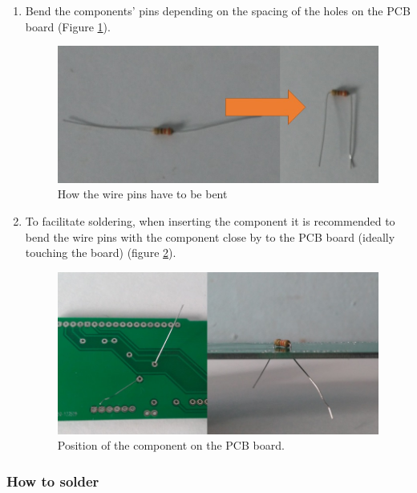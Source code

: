 \documentclass[12pt,letterpaper]{article}
\numberwithin{figure}{section}
\numberwithin{equation}{section}
\numberwithin{table}{section}
\begin{document}
\begin{enumerate}
    \item Bend the components' pins depending on the spacing of the holes on the PCB board (Figure \ref{fig:29}).
    
\begin{figure}[H]
    \centering
    \includegraphics[scale=0.5]{Figuras/figure_29.jpg}
    \caption{How the wire pins have to be bent}
    \label{fig:29}
\end{figure}

    \item To facilitate soldering, when inserting the component it is recommended to bend the wire pins with the component close by to the PCB board (ideally touching the board) (figure \ref{fig:30}).
    
\begin{figure}[H]
    \centering
    \includegraphics[scale=0.5]{Figuras/figure_30.jpg}
    \caption{Position of the component on the PCB board.}
    \label{fig:30}
\end{figure}

\end{enumerate}

\subsubsection{How to solder}
\end{document}
